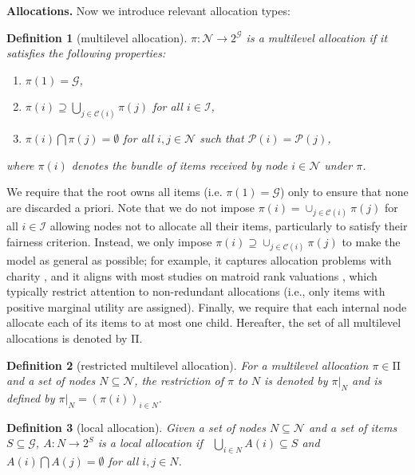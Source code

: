 \documentclass[]{article}
\newtheorem{definition}{Definition}
\newcommand{\nodes}{\mathcal{N}}
\newcommand{\items}{\mathcal{G}}
\newcommand{\children}{\mathcal{C}}
\newcommand{\parent}{\mathcal{P}}
\newcommand{\internal}{\mathcal{I}}
\newcommand{\mallocations}{\mathrm{\Pi}}
\begin{document}
\medskip

\noindent \textbf{Allocations.} Now we introduce relevant allocation types:

\begin{definition}[multilevel allocation]
$\pi : \nodes \rightarrow 2^\items$ is a \emph{multilevel allocation} if it satisfies the following properties:
\begin{enumerate}
    \item $\pi(1) = \items$,
    \item $\pi(i) \supseteq \bigcup_{j \in \children(i)} \pi(j)$ for all $i \in \internal$,
    \item $\pi(i) \bigcap \pi(j)  = \emptyset$ for all $i, j \in \nodes$ such that $\parent(i) =  \parent(j)$, 
\end{enumerate}
where $\pi(i)$ denotes the bundle of items received by node $i \in \nodes$ under $\pi$. 
\end{definition}

\noindent We require that the root owns all items (i.e. $\pi(1) = \items$) only to ensure that none are discarded a priori. Note that we do not impose $\pi(i) = \cup_{j \in \children(i)} \pi(j)$ for all $i  \in  \internal$ allowing nodes not to allocate all their items, particularly to satisfy their fairness criterion. Instead, we only impose  $\pi(i) \supseteq \cup_{j \in \children(i)} \pi(j)$ to make the model as general as possible; for example, it captures allocation problems with charity \cite{Caragiannis_et_al2019b}, and it aligns with most studies on matroid rank valuations \cite{Benabbou_et_al2021, Viswanathan_Zick2023b}, which typically restrict attention to non-redundant allocations (i.e., only items with positive marginal utility are assigned). Finally, we require that each internal node allocate each of its items to at most one child. Hereafter, the set of all multilevel allocations is denoted by $\mallocations$.

\begin{definition}[restricted multilevel allocation] For a multilevel allocation $\pi   \in   \mallocations$ and a set of nodes $N   \subseteq  \nodes$, the \emph{restriction of $\pi $ to $N$} is denoted by $\pi |_N$ and is defined by $   \pi |_N =  (\pi(i))_{i \in N}$.
\end{definition}

\begin{definition}[local allocation] Given a set of nodes $N \subseteq  \nodes$ and a set of items $S  \subseteq  \items$, $A  :  N  \rightarrow  2^S$ is a \emph{local allocation} if \ $\bigcup_{i \in N} A(i)  \subseteq  S$ and $A(i) \bigcap A(j)  =  \emptyset$ for all $i, j  \in  N$.
\end{definition}
\end{document}
